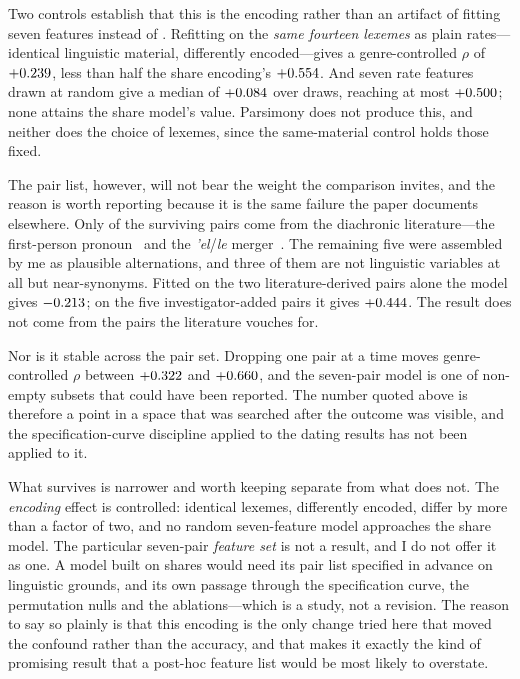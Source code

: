 \documentclass[10pt,letterpaper]{article}
\begin{document}
Two controls establish that this is the encoding rather than an artifact of
fitting seven features instead of \HBfeat.  Refitting on the \emph{same fourteen
lexemes} as plain rates---identical linguistic material, differently
encoded---gives a genre-controlled $\rho$ of $+0.239$, less than half the
share encoding's $+0.554$.  And seven rate features drawn at random give
a median of $+0.084$ over \VTctlRandN{} draws, reaching at most
$+0.500$; none attains the share model's value.  Parsimony does not
produce this, and neither does the choice of lexemes, since the same-material
control holds those fixed.

The pair list, however, will not bear the weight the comparison invites, and
the reason is worth reporting because it is the same failure the paper documents
elsewhere.  Only \VTlitPairs{} of the \VTpairs{} surviving pairs come from the
diachronic literature---the first-person pronoun~\cite{Rooker1990,Polzin1976}
and the \emph{'el}/\emph{le} merger~\cite{Polzin1976}.  The remaining five were
assembled by me as plausible alternations, and three of them are
not linguistic variables at all but near-synonyms.  Fitted on the two
literature-derived pairs alone the model gives $-0.213$; on the five
investigator-added pairs it gives $+0.444$.  The result does not come
from the pairs the literature vouches for.

Nor is it stable across the pair set.  Dropping one pair at a time moves
genre-controlled $\rho$ between $+0.322$ and $+0.660$, and the seven-pair
model is one of \VTsubsets{} non-empty subsets that could have been reported.
The number quoted above is therefore a point in a space that was searched after
the outcome was visible, and the specification-curve discipline applied to the
dating results has not been applied to it.

What survives is narrower and worth keeping separate from what does not.  The
\emph{encoding} effect is controlled: identical lexemes, differently encoded,
differ by more than a factor of two, and no random seven-feature model
approaches the share model.  The particular seven-pair \emph{feature set} is
not a result, and I do not offer it as one.  A model built on shares would need
its pair list specified in advance on linguistic grounds, and its own passage
through the specification curve, the permutation nulls and the ablations---which is a study, not a revision.  The reason to say so plainly is that this
encoding is the only change tried here that moved the confound rather than the
accuracy, and that makes it exactly the kind of promising result that a
post-hoc feature list would be most likely to overstate.
\end{document}
